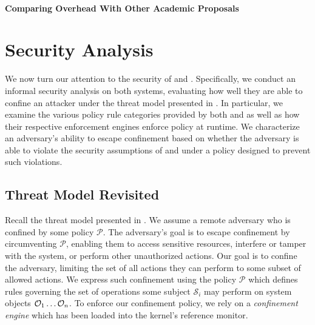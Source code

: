 \paragraph*{Comparing Overhead With Other Academic Proposals}

\section{Security Analysis}%
\label{s:eval-security}

We now turn our attention to the security of \bpfbox{} and \bpfcontain. Specifically, we
conduct an informal security analysis on both systems, evaluating how well they are able
to confine an attacker under the threat model presented in . In
particular, we examine the various policy rule categories provided by both \bpfbox{} and
\bpfcontain{} as well as how their respective enforcement engines enforce policy at
runtime. We characterize an adversary's ability to escape confinement based on whether the
adversary is able to violate the security assumptions of \bpfbox{} and \bpfcontain{} under
a policy designed to prevent such violations.


\subsection{Threat Model Revisited}

Recall the threat model presented in . We assume a remote
adversary who is confined by some policy $\mathcal{P}$. The adversary's goal is to escape
confinement by circumventing $\mathcal{P}$, enabling them to access sensitive resources,
interfere or tamper with the system, or perform other unauthorized actions. Our goal is to
confine the adversary, limiting the set of all actions they can perform to some subset of
allowed actions. We express such confinement using the policy $\mathcal{P}$ which defines
rules governing the set of operations some subject $\mathcal{S}_i$ may perform on system
objects $\mathcal{O}_1 \mathellipsis \mathcal{O}_n$. To enforce our confinement policy, we
rely on a \textit{confinement engine} which has been loaded into the kernel's reference
monitor.

